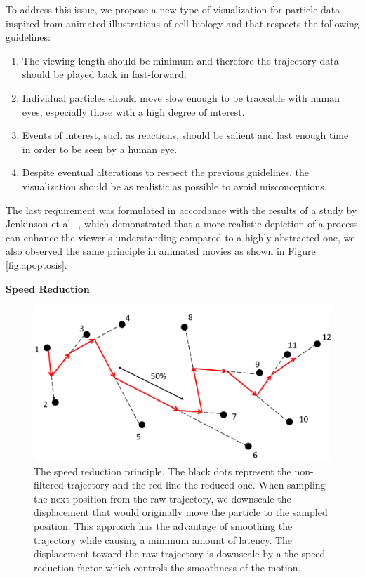 To address this issue, we propose a new type of visualization for particle-data inspired from animated illustrations of cell biology and that respects the following guidelines:
\begin{enumerate}
	\item The viewing length should be minimum and therefore the trajectory data should be played back in fast-forward.	
	\item Individual particles should move slow enough to be traceable with human eyes, especially those with a high degree of interest.	
	\item Events of interest, such as reactions, should be salient and last enough time in order to be seen by a human eye.	
	\item Despite eventual alterations to respect the previous guidelines, the visualization should be as realistic as possible to avoid misconceptions.
\end{enumerate}

The last requirement was formulated in accordance with the results of a study by Jenkinson et al.~\cite{jenkinson2012visualizing}, which demonstrated that a more realistic depiction of a process can enhance the viewer’s understanding compared to a highly abstracted one, we also observed the same principle in animated movies as shown in Figure \ref{fig:apoptosis}.



\textbf{Speed Reduction}

\begin{figure}
	\centering
	\includegraphics[width=0.5\linewidth]{graphics/SpeedReduction}
	\caption{The speed reduction principle. The black dots represent the non-filtered trajectory and the red line the reduced one. When sampling the next position from the raw trajectory, we downscale the displacement that would originally move the particle to the sampled position. This approach has the advantage of smoothing the trajectory while causing a minimum amount of latency. The displacement toward the raw-trajectory is downscale by a the speed reduction factor which controls the smoothness of the motion.}
	\label{fig:speedreduction}
\end{figure}

